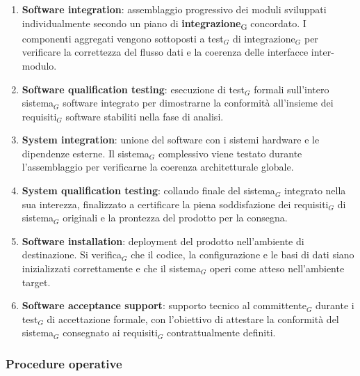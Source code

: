 \documentclass[a4paper, 10pt]{article}
\begin{document}
\begin{enumerate}
    \item \textbf{Software integration}: assemblaggio progressivo dei moduli sviluppati individualmente secondo un piano di \textbf{integrazione}\textsubscript{G} concordato. I componenti aggregati vengono sottoposti a test$_G$ di integrazione$_G$ per verificare la correttezza del flusso dati e la coerenza delle interfacce inter-modulo.

    \item \textbf{Software qualification testing}: esecuzione di test$_G$ formali sull'intero sistema$_G$ software integrato per dimostrarne la conformità all'insieme dei requisiti$_G$ software stabiliti nella fase di analisi.

    \item \textbf{System integration}: unione del software con i sistemi hardware e le dipendenze esterne. Il sistema$_G$ complessivo viene testato durante l'assemblaggio per verificarne la coerenza architetturale globale.

    \item \textbf{System qualification testing}: collaudo finale del sistema$_G$ integrato nella sua interezza, finalizzato a certificare la piena soddisfazione dei requisiti$_G$ di sistema$_G$ originali e la prontezza del prodotto per la consegna.

    \item \textbf{Software installation}: deployment del prodotto nell'ambiente di destinazione. Si verifica$_G$ che il codice, la configurazione e le basi di dati siano inizializzati correttamente e che il sistema$_G$ operi come atteso nell'ambiente target.

    \item \textbf{Software acceptance support}: supporto tecnico al committente$_G$ durante i test$_G$ di accettazione formale, con l'obiettivo di attestare la conformità del sistema$_G$ consegnato ai requisiti$_G$ contrattualmente definiti.
\end{enumerate}

\subsubsection{Procedure operative}
\end{document}
